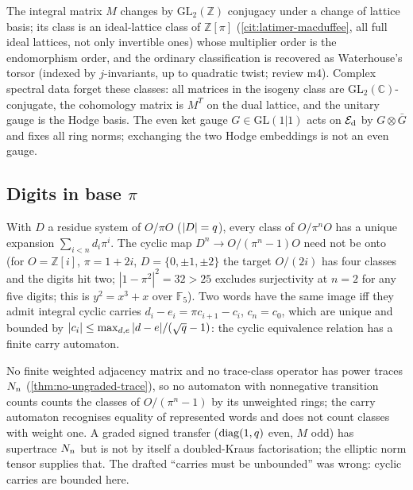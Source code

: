 \begin{proposition}
\label{prop:integral-marking-gauge}
The integral matrix $M$ changes by $\mathrm{GL}_2(\mathbb Z)$ conjugacy under a change of lattice
basis; its class is an ideal-lattice class of $\mathbb Z[\pi]$ (\cref{cit:latimer-macduffee}, all
full ideal lattices, not only invertible ones) whose multiplier order is the endomorphism
order, and the ordinary classification is recovered as Waterhouse's torsor (indexed by
$j$-invariants, up to quadratic twist; review m4). Complex spectral
data forget these classes: all matrices in the isogeny class are $\mathrm{GL}_2(\mathbb C)$-conjugate,
the cohomology matrix is $M^T$ on the dual lattice, and the unitary gauge is the Hodge basis.
The even ket gauge $G\in\mathrm{GL}(1|1)$ acts on $\mathcal E_{\mathrm d}$ by $G\otimes\bar G$ and fixes all ring
norms; exchanging the two Hodge embeddings is not an even gauge.
\end{proposition}

\subsection{Digits in base $\pi$}

\begin{proposition}
\label{prop:cyclic-digits-carries}
With $D$ a residue system of $O/\pi O$ ($|D| = q$), every class of $O/\pi^nO$ has a unique
expansion $\sum_{i<n}d_i\pi^i$. The cyclic map $D^n\to O/(\pi^n-1)O$ need not be onto (for
$O = \mathbb Z[i]$, $\pi = 1+2i$, $D = \{0,\pm1,\pm2\}$ the target $O/(2i)$ has four classes and the
digits hit two; $|1-\pi^2|^2 = 32>25$ excludes surjectivity at $n = 2$ for any five digits; this
is $y^2 = x^3+x$ over $\mathbb F_5$). Two words have the same image iff they admit integral cyclic
carries $d_i-e_i = \pi c_{i+1}-c_i$, $c_n = c_0$, which are unique and bounded by
$|c_i|\le\max_{d,e}|d-e|/(\sqrt{q}-1)$: the cyclic equivalence relation has a finite carry
automaton.
\end{proposition}

\begin{proposition}
\label{prop:carry-automaton-no-count}
No finite weighted adjacency matrix and no trace-class operator has power traces
$N_{n}$ (\cref{thm:no-ungraded-trace}), so no automaton with nonnegative transition counts
counts the classes of $O/(\pi^n-1)$ by its unweighted rings; the carry automaton recognises
equality of represented words and does not count classes with weight one. A graded signed
transfer ($\operatorname{diag}(1,q)$ even, $M$ odd) has supertrace $N_{n}$ but is not by itself a
doubled-Kraus factorisation; the elliptic norm tensor supplies that. The drafted ``carries must
be unbounded'' was wrong: cyclic carries are bounded here.
\end{proposition}

